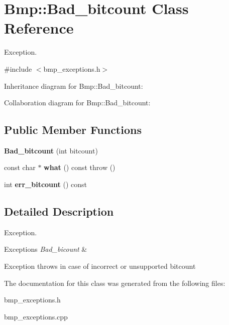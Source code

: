 \hypertarget{classBmp_1_1Bad__bitcount}{}\section{Bmp\+:\+:Bad\+\_\+bitcount Class Reference}
\label{classBmp_1_1Bad__bitcount}


Exception.  




{\ttfamily \#include $<$bmp\+\_\+exceptions.\+h$>$}



Inheritance diagram for Bmp\+:\+:Bad\+\_\+bitcount\+:


Collaboration diagram for Bmp\+:\+:Bad\+\_\+bitcount\+:
\subsection*{Public Member Functions}
\begin{DoxyCompactItemize}
\item 
{\bfseries Bad\+\_\+bitcount} (int bitcount)\hypertarget{classBmp_1_1Bad__bitcount_a84a1f205679e716118f966d96d7014cf}{}\label{classBmp_1_1Bad__bitcount_a84a1f205679e716118f966d96d7014cf}

\item 
const char $\ast$ {\bfseries what} () const   throw ()\hypertarget{classBmp_1_1Bad__bitcount_abe5d81fe1b5ab81084308ea6abcea853}{}\label{classBmp_1_1Bad__bitcount_abe5d81fe1b5ab81084308ea6abcea853}

\item 
int {\bfseries err\+\_\+bitcount} () const \hypertarget{classBmp_1_1Bad__bitcount_a6d7358f13b176d37be4e6b3be65865d2}{}\label{classBmp_1_1Bad__bitcount_a6d7358f13b176d37be4e6b3be65865d2}

\end{DoxyCompactItemize}


\subsection{Detailed Description}
Exception. 


\begin{DoxyExceptions}{Exceptions}
{\em Bad\+\_\+bicount} & \\
\hline
\end{DoxyExceptions}
Exception throws in case of incorrect or unsupported bitcount 

The documentation for this class was generated from the following files\+:\begin{DoxyCompactItemize}
\item 
bmp\+\_\+exceptions.\+h\item 
bmp\+\_\+exceptions.\+cpp\end{DoxyCompactItemize}
